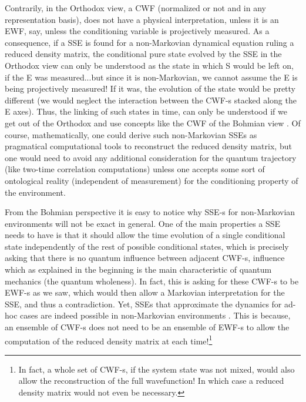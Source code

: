 \documentclass[11pt, a4paper]{article} %
\begin{document}
Contrarily, in the Orthodox view, a CWF (normalized or not and in any representation basis), does not have a physical interpretation, unless it is an EWF, say, unless the conditioning variable is projectively measured. As a consequence, if a SSE is found for a non-Markovian dynamical equation ruling a reduced density matrix, the conditional pure state evolved by the SSE in the Orthodox view can only be understood as the state in which S would be left on, if the E was measured...but since it is non-Markovian, we cannot assume the E is being projectively measured! If it was, the evolution of the state would be pretty different (we would neglect the interaction between the CWF-s stacked along the E axes). Thus, the linking of such states in time, can only be understood if we get out of the Orthodox and use concepts like the CWF of the Bohmian view \cite{NMisModal, interpretSSE}. Of course, mathematically, one could derive such non-Markovian SSEs as pragmatical computational tools to reconstruct the reduced density matrix, but one would need to avoid any additional consideration for the quantum trajectory (like two-time correlation computations) unless one accepts some sort of ontological reality (independent of measurement) for the conditioning property of the environment.

From the Bohmian perspective it is easy to notice why SSE-s for non-Markovian environments will not be exact in general. One of the main properties a SSE needs to have is that it should allow the time evolution of a single conditional state independently of the rest of possible conditional states, which is precisely asking that there is no quantum influence between adjacent CWF-s, influence which as explained in the beginning is the main characteristic of quantum mechanics (the quantum wholeness). In fact, this is asking for these CWF-s to be EWF-s as we saw, which would then allow a Markovian interpretation for the SSE, and thus a contradiction. Yet, SSEs that approximate the dynamics for ad-hoc cases are indeed possible in non-Markovian environments \cite{ Diosi, WisemanSSE, Thz}. This is because, an ensemble of CWF-s does not need to be an ensemble of EWF-s to allow the computation of the reduced density matrix at each time!\footnote{In fact, a whole set of CWF-s, if the system state was not mixed, would also allow the reconstruction of the full wavefunction! In which case a reduced density matrix would not even be necessary.} 
\end{document}
